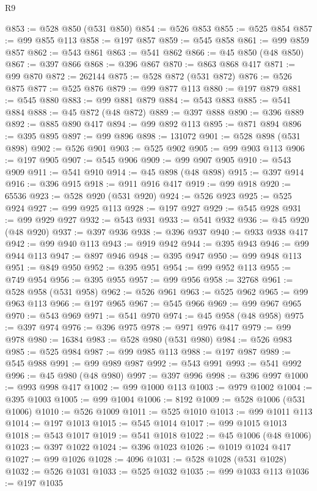 \begin{lexlean}{R9}
\begin{coremodule}
{{{{{{{{{{{{{{{{{{{{{{{{{{{{{{{{{{{{{{{{{{{{{{{{{{{{{{{{{{{{{{{{{{{{{{{{{{{{{{{{{{{{@853 := @528 @850 (@531 @850)
@854 := @526 @853
@855 := @525 @854
@857 := @99 @855 @113
@858 := @197 @857
@859 := @545 @858
@861 := @99 @859 @857
@862 := @543 @861
@863 := @541 @862
@866 := @45 @850 (@48 @850)
@867 := @397 @866
@868 := @396 @867
@870 := @863 @868 @417
@871 := @99 @870
@872 := 262144
@875 := @528 @872 (@531 @872)
@876 := @526 @875
@877 := @525 @876
@879 := @99 @877 @113
@880 := @197 @879
@881 := @545 @880
@883 := @99 @881 @879
@884 := @543 @883
@885 := @541 @884
@888 := @45 @872 (@48 @872)
@889 := @397 @888
@890 := @396 @889
@892 := @885 @890 @417
@894 := @99 @892 @113
@895 := @871 @894
@896 := @395 @895
@897 := @99 @896
@898 := 131072
@901 := @528 @898 (@531 @898)
@902 := @526 @901
@903 := @525 @902
@905 := @99 @903 @113
@906 := @197 @905
@907 := @545 @906
@909 := @99 @907 @905
@910 := @543 @909
@911 := @541 @910
@914 := @45 @898 (@48 @898)
@915 := @397 @914
@916 := @396 @915
@918 := @911 @916 @417
@919 := @99 @918
@920 := 65536
@923 := @528 @920 (@531 @920)
@924 := @526 @923
@925 := @525 @924
@927 := @99 @925 @113
@928 := @197 @927
@929 := @545 @928
@931 := @99 @929 @927
@932 := @543 @931
@933 := @541 @932
@936 := @45 @920 (@48 @920)
@937 := @397 @936
@938 := @396 @937
@940 := @933 @938 @417
@942 := @99 @940 @113
@943 := @919 @942
@944 := @395 @943
@946 := @99 @944 @113
@947 := @897 @946
@948 := @395 @947
@950 := @99 @948 @113
@951 := @849 @950
@952 := @395 @951
@954 := @99 @952 @113
@955 := @749 @954
@956 := @395 @955
@957 := @99 @956
@958 := 32768
@961 := @528 @958 (@531 @958)
@962 := @526 @961
@963 := @525 @962
@965 := @99 @963 @113
@966 := @197 @965
@967 := @545 @966
@969 := @99 @967 @965
@970 := @543 @969
@971 := @541 @970
@974 := @45 @958 (@48 @958)
@975 := @397 @974
@976 := @396 @975
@978 := @971 @976 @417
@979 := @99 @978
@980 := 16384
@983 := @528 @980 (@531 @980)
@984 := @526 @983
@985 := @525 @984
@987 := @99 @985 @113
@988 := @197 @987
@989 := @545 @988
@991 := @99 @989 @987
@992 := @543 @991
@993 := @541 @992
@996 := @45 @980 (@48 @980)
@997 := @397 @996
@998 := @396 @997
@1000 := @993 @998 @417
@1002 := @99 @1000 @113
@1003 := @979 @1002
@1004 := @395 @1003
@1005 := @99 @1004
@1006 := 8192
@1009 := @528 @1006 (@531 @1006)
@1010 := @526 @1009
@1011 := @525 @1010
@1013 := @99 @1011 @113
@1014 := @197 @1013
@1015 := @545 @1014
@1017 := @99 @1015 @1013
@1018 := @543 @1017
@1019 := @541 @1018
@1022 := @45 @1006 (@48 @1006)
@1023 := @397 @1022
@1024 := @396 @1023
@1026 := @1019 @1024 @417
@1027 := @99 @1026
@1028 := 4096
@1031 := @528 @1028 (@531 @1028)
@1032 := @526 @1031
@1033 := @525 @1032
@1035 := @99 @1033 @113
@1036 := @197 @1035
}}}}}}}}}}}}}}}}}}}}}}}}}}}}}}}}}}}}}}}}}}}}}}}}}}}}}}}}}}}}}}}}}}}}}}}}}}}}}}}}}}}}
\end{coremodule}
\end{lexlean}
